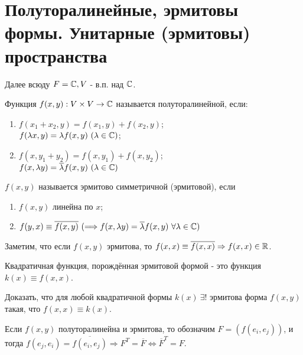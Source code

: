 \section{Полуторалинейные, эрмитовы формы. Унитарные (эрмитовы) пространства}
Далее всюду $F = \mathbb{C}, V$ - в.п. над $\mathbb{C}$.
\begin{definition}
    Функция $f(x, y): V\times V \rightarrow \mathbb{C}$ называется полуторалинейной, если:
    \begin{enumerate}
        \item $f(x_1 + x_2, y) = f(x_1, y) + f(x_2, y)$;\\
              $f(\lambda x, y) = \lambda f(x, y) \ (\lambda \in \mathbb{C})$;
        \item $f(x, y_1 + y_2) = f(x, y_1) + f(x, y_2)$;\\
              $f(x, \lambda y) = \overline{\lambda} f(x, y) \ (\lambda \in \mathbb{C})$
    \end{enumerate}
\end{definition}
\begin{definition}
    $f(x,y)$ называется эрмитово симметричной (эрмитовой), если 
    \begin{enumerate}
        \item $f(x, y)$ линейна по $x$;
        \item $f(y, x) \equiv \overline{f(x,y)} \ (\Longrightarrow f(x, \lambda y) = \overline{\lambda}f(x,y) \ \forall \lambda \in \CC)$
    \end{enumerate}
\end{definition}
Заметим, что если $f(x,y)$ эрмитова, то $f(x, x) \equiv \overline{f(x,x)} \Rightarrow f(x,x) \in \mathbb{R}$.
\begin{definition}
    Квадратичная функция, порождённая эрмитовой формой - это функция $k(x) \equiv f(x,x)$.
\end{definition}
\begin{exercise}
    Доказать, что для любой квадратичной формы $k(x) \ \exists!$ эрмитова форма $f(x, y)$ такая, что $f(x,x) \equiv k(x)$. 
\end{exercise}
Если $f(x,y)$ полуторалинейна и эрмитова, то обозначим $F = (f(e_i, e_j))$, и тогда $f(e_j, e_i) = \overline{f(e_i, e_j)} \Longrightarrow F^T = \overline{F} \Longleftrightarrow \overline{F}^T = F$.
